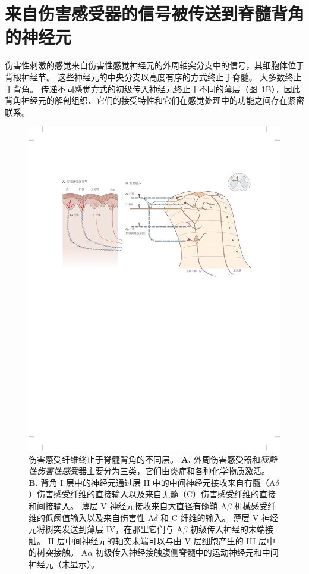 \section{来自伤害感受器的信号被传送到脊髓背角的神经元}

伤害性刺激的感觉来自伤害性感觉神经元的外周轴突分支中的信号，其细胞体位于背根神经节。
这些神经元的中央分支以高度有序的方式终止于脊髓。
大多数终止于背角。
传递不同感觉方式的初级传入神经元终止于不同的薄层（图~\ref{fig:20_3}B），因此背角神经元的解剖组织、它们的接受特性和它们在感觉处理中的功能之间存在紧密联系。


\begin{figure}[htbp]
	\centering
	\includegraphics[width=1.0\linewidth]{chap20/fig_20_3}
	\caption{伤害感受纤维终止于脊髓背角的不同层。
		\textbf{A.} 外周伤害感受器和\textit{寂静性伤害性感受}器主要分为三类，它们由炎症和各种化学物质激活。
		\textbf{B.} 背角 I 层中的神经元通过层 II 中的中间神经元接收来自有髓（A$ \delta $）伤害感受纤维的直接输入以及来自无髓（C）伤害感受纤维的直接和间接输入。
		薄层 V 神经元接收来自大直径有髓鞘 A$ \beta $ 机械感受纤维的低阈值输入以及来自伤害性 A$ \delta $ 和 C 纤维的输入。
		薄层 V 神经元将树突发送到薄层 IV，在那里它们与 A$ \beta $ 初级传入神经的末端接触。
		II 层中间神经元的轴突末端可以与由 V 层细胞产生的 III 层中的树突接触。
		A$ \alpha $ 初级传入神经接触腹侧脊髓中的运动神经元和中间神经元（未显示）\cite{fields1987painful}。}
	\label{fig:20_3}
\end{figure}


